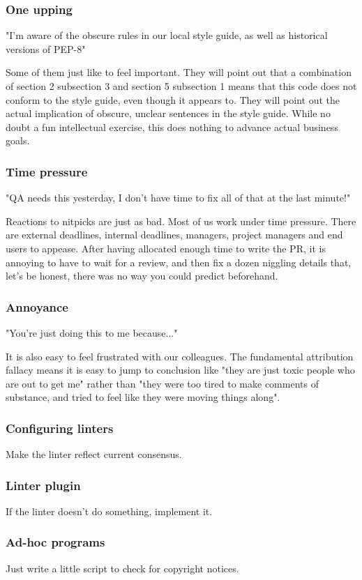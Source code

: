 \begin{frame}
\frametitle{One upping}
"I'm aware of the obscure rules in our local style guide,
as well as historical versions of PEP-8"
\end{frame}

Some of them just like to feel important.
They will point out that a combination of section 2 subsection 3
and section 5 subsection 1 means that this code does not
conform to the style guide,
even though it appears to.
They will point out the actual implication
of obscure,
unclear
sentences in the style guide.
While no doubt a fun intellectual exercise,
this does nothing to advance actual business goals.

\begin{frame}
\frametitle{Time pressure}
"QA needs this yesterday,
I don't have time to fix all of that at the last minute!"
\end{frame}

Reactions to nitpicks are just as bad.
Most of us work under time pressure.
There are external deadlines,
internal deadlines,
managers,
project managers
and end users to appease.
After having allocated enough time to write the PR,
it is annoying to have to wait for a review,
and then fix a dozen niggling details that,
let's be honest,
there was no way you could predict beforehand.

\begin{frame}
\frametitle{Annoyance}
"You're just doing this to me because..."
\end{frame}

It is also easy to feel frustrated with our colleagues.
The fundamental attribution fallacy means it is easy 
to jump to conclusion like
"they are just toxic people who are out to get me"
rather than
"they were too tired to make comments of substance,
and tried to feel like they were moving things along".

\begin{frame}
\frametitle{Configuring linters}
Make the linter reflect current consensus.
\end{frame}

\begin{frame}
\frametitle{Linter plugin}
If the linter doesn't do something,
implement it.
\end{frame}

\begin{frame}
\frametitle{Ad-hoc programs}
Just write a little script to check for copyright notices.
\end{frame}

